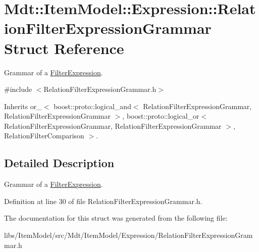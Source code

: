 \hypertarget{struct_mdt_1_1_item_model_1_1_expression_1_1_relation_filter_expression_grammar}{}\section{Mdt\+:\+:Item\+Model\+:\+:Expression\+:\+:Relation\+Filter\+Expression\+Grammar Struct Reference}
\label{struct_mdt_1_1_item_model_1_1_expression_1_1_relation_filter_expression_grammar}


Grammar of a \hyperlink{class_mdt_1_1_item_model_1_1_filter_expression}{Filter\+Expression}.  




{\ttfamily \#include $<$Relation\+Filter\+Expression\+Grammar.\+h$>$}



Inherits or\+\_\+$<$ boost\+::proto\+::logical\+\_\+and$<$ Relation\+Filter\+Expression\+Grammar, Relation\+Filter\+Expression\+Grammar $>$, boost\+::proto\+::logical\+\_\+or$<$ Relation\+Filter\+Expression\+Grammar, Relation\+Filter\+Expression\+Grammar $>$, Relation\+Filter\+Comparison $>$.



\subsection{Detailed Description}
Grammar of a \hyperlink{class_mdt_1_1_item_model_1_1_filter_expression}{Filter\+Expression}. 

Definition at line 30 of file Relation\+Filter\+Expression\+Grammar.\+h.



The documentation for this struct was generated from the following file\+:\begin{DoxyCompactItemize}
\item 
libs/\+Item\+Model/src/\+Mdt/\+Item\+Model/\+Expression/Relation\+Filter\+Expression\+Grammar.\+h\end{DoxyCompactItemize}
